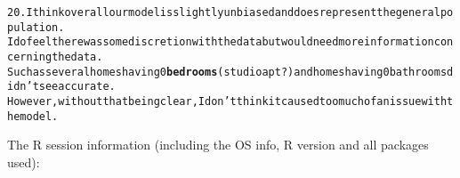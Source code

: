 \documentclass{article}\usepackage[]{graphicx}\usepackage[]{xcolor}
\makeatletter
\newcommand{\hlkwd}[1]{\textcolor[rgb]{0.737,0.353,0.396}{\textbf{#1}}}%
\newenvironment{kframe}{%
 \def\at@end@of@kframe{}%
 \ifinner\ifhmode%
  \def\at@end@of@kframe{\end{minipage}}%
  \begin{minipage}{\columnwidth}%
 \fi\fi%
 \def\FrameCommand##1{\hskip\@totalleftmargin \hskip-\fboxsep
 \colorbox{shadecolor}{##1}\hskip-\fboxsep
     \hskip-\linewidth \hskip-\@totalleftmargin \hskip\columnwidth}%
 \MakeFramed {\advance\hsize-\width
   \@totalleftmargin\z@ \linewidth\hsize
   \@setminipage}}%
 {\par\unskip\endMakeFramed%
 \at@end@of@kframe}
\newenvironment{knitrout}{}{} %
\makeatother
\begin{document}
\begin{knitrout}
\begin{kframe}
\begin{alltt}
20.  I think overall our model is slightly unbiased and does represent the general population. 
    I do feel there was some discretion with the data but would need more information concerning the data. 
    Such as several homes having 0 \hlkwd{bedrooms} (studio apt?) and homes having 0 bathrooms didn't see accurate.  
    However, without that being clear, I don't think it caused too much of an issue with the model. 
   
\end{alltt}


{\ttfamily\noindent\bfseries{}}\end{kframe}
\end{knitrout}

The R session information (including the OS info, R version and all
packages used):
\end{document}
